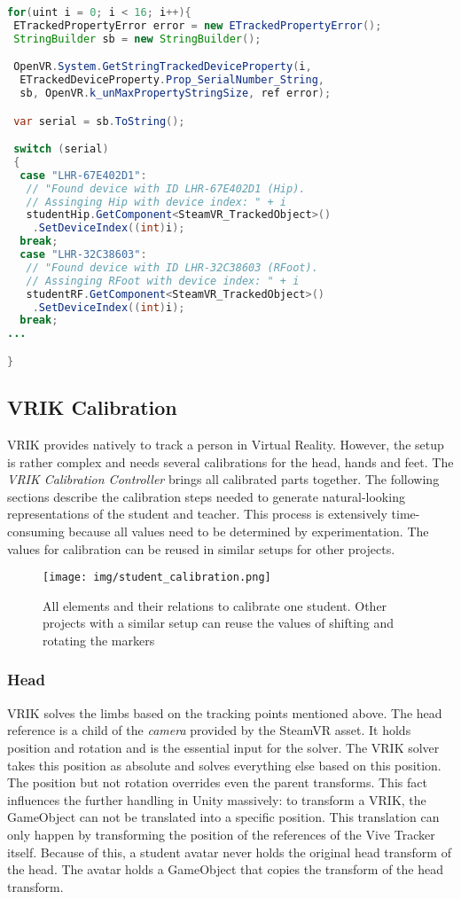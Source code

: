 \begin{lstlisting}[language=JAVA, frame=single]
for(uint i = 0; i < 16; i++){
 ETrackedPropertyError error = new ETrackedPropertyError();
 StringBuilder sb = new StringBuilder();

 OpenVR.System.GetStringTrackedDeviceProperty(i,
  ETrackedDeviceProperty.Prop_SerialNumber_String, 
  sb, OpenVR.k_unMaxPropertyStringSize, ref error);

 var serial = sb.ToString();

 switch (serial)
 {
  case "LHR-67E402D1":
   // "Found device with ID LHR-67E402D1 (Hip).
   // Assinging Hip with device index: " + i
   studentHip.GetComponent<SteamVR_TrackedObject>()
    .SetDeviceIndex((int)i);
  break;
  case "LHR-32C38603":
   // "Found device with ID LHR-32C38603 (RFoot).
   // Assinging RFoot with device index: " + i
   studentRF.GetComponent<SteamVR_TrackedObject>()
    .SetDeviceIndex((int)i);
  break;
...

}
\end{lstlisting}

\subsection{VRIK Calibration}
VRIK provides natively to track a person in Virtual Reality. However, the setup is rather complex and needs several calibrations for the head, hands and feet. The \textit{VRIK Calibration Controller} brings all calibrated parts together. The following sections describe the calibration steps needed to generate natural-looking representations of the student and teacher. This process is extensively time-consuming because all values need to be determined by experimentation. The values for calibration can be reused in similar setups for other projects.
\begin{figure}
	\centering
	\texttt{[image: img/student\_calibration.png]}
	\caption{All elements and their relations to calibrate one student. Other projects with a similar setup can reuse the values of shifting and rotating the markers}
	\label{fig:student_calibration}
\end{figure}
\subsubsection{Head}
VRIK solves the limbs based on the tracking points mentioned above. The head reference is a child of the \textit{camera} provided by the SteamVR asset. It holds position and rotation and is the essential input for the solver. The VRIK solver takes this position as absolute and solves everything else based on this position. The position but not rotation overrides even the parent transforms. This fact influences the further handling in Unity massively: to transform a VRIK, the GameObject can not be translated into a specific position. This translation can only happen by transforming the position of the references of the Vive Tracker itself. Because of this, a student avatar never holds the original head transform of the head. The avatar holds a GameObject that copies the transform of the head transform.
